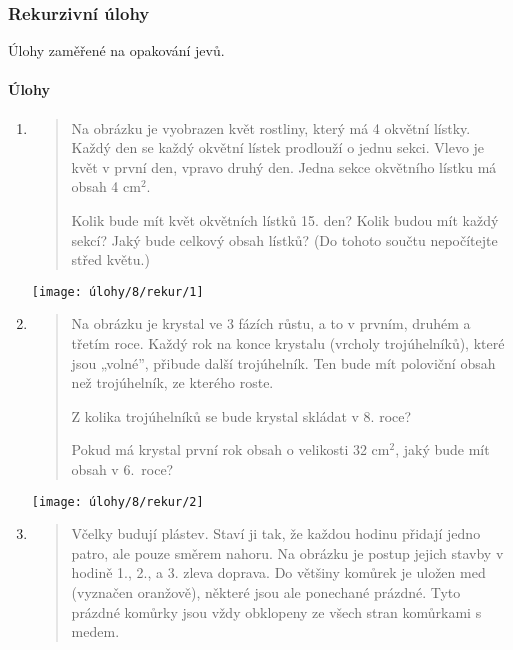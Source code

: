 \newpage

\subsubsection{Rekurzivní úlohy}
Úlohy zaměřené na opakování jevů.

\paragraph{Úlohy}
\begin{enumerate}
    \item
    \begin{minipage}[t]{\linewidth}
        \begin{quote}
            Na obrázku je vyobrazen květ rostliny, který má 4 okvětní lístky. Každý den se každý okvětní lístek prodlouží o jednu sekci. Vlevo je květ v první den, vpravo druhý den. Jedna sekce okvětního lístku má obsah 4 cm$^{2}$.

            Kolik bude mít květ okvětních lístků 15. den? Kolik budou mít každý sekcí? Jaký bude celkový obsah lístků? (Do tohoto součtu nepočítejte střed květu.)
        \end{quote}
        \centering
        \texttt{[image: úlohy/8/rekur/1]}
    \end{minipage}

    \item
    \begin{minipage}[t]{\linewidth}
        \begin{quote}
            Na obrázku je krystal ve 3 fázích růstu, a to v prvním, druhém a třetím roce. Každý rok na konce krystalu (vrcholy trojúhelníků), které jsou „volné”, přibude další trojúhelník. Ten bude mít poloviční obsah než trojúhelník, ze kterého roste.

            Z kolika trojúhelníků se bude krystal skládat v 8. roce?

            Pokud má krystal první rok obsah o velikosti 32 cm$^{2}$, jaký bude mít obsah v 6.~roce?
        \end{quote}
        \centering
        \texttt{[image: úlohy/8/rekur/2]}
    \end{minipage}

    \item
    \begin{minipage}[t]{\linewidth}
        \begin{quote}
            Včelky budují plástev. Staví ji tak, že každou hodinu přidají jedno patro, ale pouze směrem nahoru. Na obrázku je postup jejich stavby v hodině 1., 2., a 3. zleva doprava. Do většiny komůrek je uložen med (vyznačen oranžově), některé jsou ale ponechané prázdné. Tyto prázdné komůrky jsou vždy obklopeny ze všech stran komůrkami s medem.


\end{quote}
\end{minipage}
\end{enumerate}
